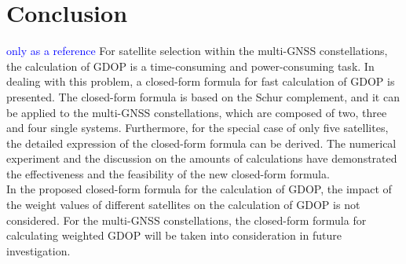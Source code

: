 \documentclass[a4paper]{report}
\begin{document}
\section{Conclusion}
\textcolor{blue}{only as a reference}
For satellite selection within the multi-GNSS constellations,
the calculation of GDOP is a time-consuming and
power-consuming task. In dealing with this problem, a
closed-form formula for fast calculation of GDOP is presented.
The closed-form formula is based on the Schur
complement, and it can be applied to the multi-GNSS
constellations, which are composed of two, three and four
single systems. Furthermore, for the special case of only
five satellites, the detailed expression of the closed-form
formula can be derived. The numerical experiment and the
discussion on the amounts of calculations have demonstrated
the effectiveness and the feasibility of the new
closed-form formula.\\
In the proposed closed-form formula for the calculation
of GDOP, the impact of the weight values of different
satellites on the calculation of GDOP is not considered. For
the multi-GNSS constellations, the closed-form formula for
calculating weighted GDOP will be taken into consideration
in future investigation.
\end{document}

